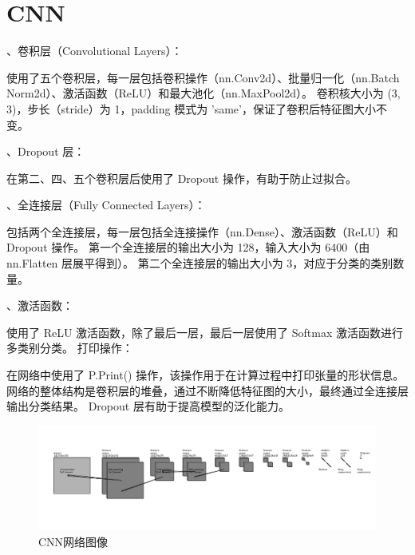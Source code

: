 \section{CNN}
、卷积层（Convolutional Layers）：

使用了五个卷积层，每一层包括卷积操作（nn.Conv2d）、批量归一化（nn.Batch\\Norm2d）、激活函数（ReLU）和最大池化（nn.MaxPool2d）。
卷积核大小为 (3, 3)，步长（stride）为 1，padding 模式为 'same'，保证了卷积后特征图大小不变。

、Dropout 层：

在第二、四、五个卷积层后使用了 Dropout 操作，有助于防止过拟合。

、全连接层（Fully Connected Layers）：

包括两个全连接层，每一层包括全连接操作（nn.Dense）、激活函数（ReLU）和 Dropout 操作。
第一个全连接层的输出大小为 128，输入大小为 6400（由 nn.Flatten 层展平得到）。
第二个全连接层的输出大小为 3，对应于分类的类别数量。

、激活函数：

使用了 ReLU 激活函数，除了最后一层，最后一层使用了 Softmax 激活函数进行多类别分类。
打印操作：

在网络中使用了 P.Print() 操作，该操作用于在计算过程中打印张量的形状信息。
网络的整体结构是卷积层的堆叠，通过不断降低特征图的大小，最终通过全连接层输出分类结果。 Dropout 层有助于提高模型的泛化能力。
\begin{figure}[H]
	\centering
	\includegraphics[width=1\textwidth]{convnet_fig.png}
	\caption{CNN网络图像}
	\label{fig:example}
\end{figure}
